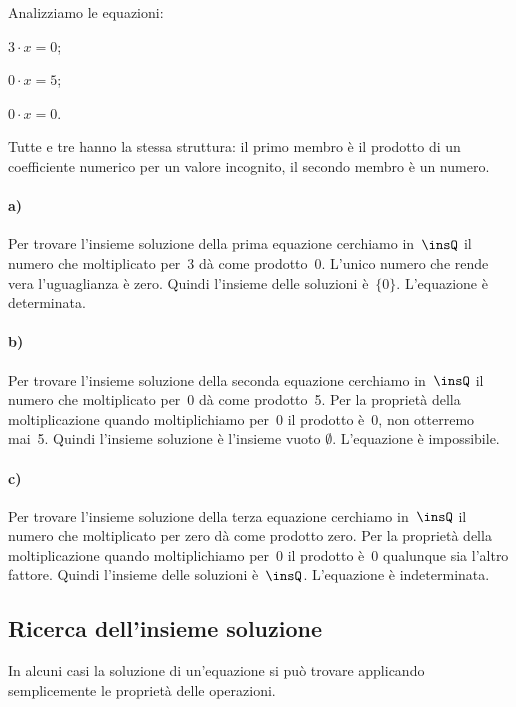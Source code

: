 \begin{exrig}
 \begin{esempio}
 Analizziamo le equazioni:
\begin{multicols}{3}
 \begin{enumeratea}
 \item $3\cdot x=0$;
 \item $0\cdot x=5$;
 \item $0\cdot x=0$.
\end{enumeratea}
\end{multicols}

Tutte e tre hanno la stessa struttura: il primo membro è il prodotto
di un coefficiente numerico per un valore incognito, il secondo membro
è un numero.

\paragraph{a)} Per trovare l'insieme soluzione della prima equazione cerchiamo in~$\insQ$ il
numero che moltiplicato per~3 dà come prodotto~0. L'unico numero che rende vera
l'uguaglianza è zero. Quindi l'insieme delle soluzioni è~$\{0\}$. L'equazione è
determinata.

\paragraph{b)} Per trovare l'insieme soluzione della seconda equazione cerchiamo in~$\insQ$ il
numero che moltiplicato per~0 dà come prodotto~5. Per la proprietà
della moltiplicazione quando moltiplichiamo per~0 il prodotto è~0,
non otterremo mai~5. Quindi l'insieme soluzione è
l'insieme vuoto $\emptyset$. L'equazione è
impossibile.

\paragraph{c)} Per trovare l'insieme soluzione della terza equazione cerchiamo in~$\insQ$ il
numero che moltiplicato per zero dà come prodotto zero. Per la
proprietà della moltiplicazione quando moltiplichiamo per~0 il
prodotto è~0 qualunque sia l'altro fattore. Quindi
l'insieme delle soluzioni è~$\insQ$. L'equazione è
indeterminata.
 \end{esempio}
\end{exrig}

\subsection{Ricerca dell'insieme soluzione}
In alcuni casi la soluzione di un'equazione si può
trovare applicando semplicemente le proprietà delle operazioni.

